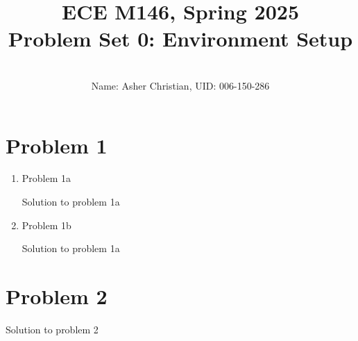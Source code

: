\documentclass[11pt]{article}
\newcommand{\cnum}{ECE M146}
\newcommand{\ced}{Spring 2025}
\newcommand{\ctitle}[4]{\title{\vspace{-0.5in}\cnum, \ced\\Problem Set #1: #2}\author{\vspace{-0.35in}\\Name: #3, UID: #4}}
\newcommand{\solution}[1]{{{\color{blue}{\bf Solution:} {#1}}}}
\begin{document}
\ctitle{0}{Environment Setup}{Asher Christian}{006-150-286}
\date{}
\maketitle
\vspace{-0.75in}

\section{Problem 1}
\begin{enumerate}
\item Problem 1a

\solution{Solution to problem 1a}

\vspace{10cm}
\item Problem 1b

\solution{Solution to problem 1a}
\end{enumerate}

\newpage
\section{Problem 2}

\solution{Solution to problem 2}
\newpage
\end{document}
